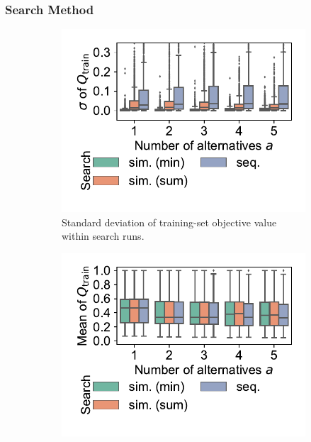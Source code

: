 \documentclass{article}
\theoremstyle{definition}
\begin{document}
\subsubsection{Search Method}
\label{sec:afs:evaluation:search:method}

\begin{figure}[p]
	\centering
	\begin{subfigure}[t]{0.48\textwidth}
		\centering
		\includegraphics[width=\textwidth, trim=15 25 15 10, clip]{plots/afs-impact-search-stddev-train-objective.pdf}
		\caption{Standard deviation of training-set objective value within search runs.}
		\label{fig:afs:impact-search-stddev-train-objective}
	\end{subfigure}
	\hfill
	\begin{subfigure}[t]{0.48\textwidth}
		\centering
		\includegraphics[width=\textwidth, trim=15 25 15 10, clip]{plots/afs-impact-search-mean-train-objective.pdf}

\end{subfigure}
\end{figure}
\end{document}
